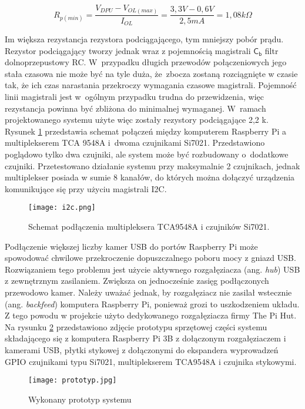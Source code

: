 \documentclass[a4paper,11pt,twoside]{article}
\begin{document}
\begin{equation} \label{pullup}
R_{p(min)} = \frac{V_{DPU} - V_{OL(max)}}{I_{OL}} = \frac{3,3 V - 0,6 V}{2,5 mA} = 1,08 k\Omega  
\end{equation} 

Im większa rezystancja rezystora podciągającego, tym mniejszy pobór prądu. Rezystor podciągający tworzy jednak wraz z pojemnością magistrali $\mathsf{C_{b}}$ filtr dolnoprzepustowy RC. W~przypadku długich przewodów połączeniowych jego stała czasowa nie może być na tyle duża, że~zbocza zostaną rozciągnięte w czasie tak, że ich czas narastania przekroczy wymagania czasowe magistrali. Pojemność linii magistrali jest w~ogólnym przypadku trudna do przewidzenia, więc rezystancja powinna być zbliżona do minimalnej wymaganej. W~ramach projektowanego systemu użyte więc zostały rezystory podciągające 2,2 k\textOmega. Rysunek \ref{fig: i2c_schemat} przedstawia schemat połączeń między komputerem Raspberry Pi a multiplekserem TCA 9548A i~dwoma czujnikami Si7021. Przedstawiono poglądowo tylko dwa czujniki, ale system może być rozbudowany o~dodatkowe czujniki. Przetestowano działanie systemu przy maksymalnie 2 czujnikach, jednak multiplekser posiada w sumie 8 kanałów, do których można dołączyć urządzenia komunikujące się przy użyciu magistrali I2C.

\begin{figure}[h]
\texttt{[image: i2c.png]}
\caption{Schemat podłączenia multipleksera TCA9548A i czujników Si7021.}
\label{fig: i2c_schemat}
\end{figure}

Podłączenie większej liczby kamer USB do portów Raspberry Pi może spowodować chwilowe przekroczenie dopuszczalnego poboru mocy z gniazd USB. Rozwiązaniem tego problemu jest użycie aktywnego rozgałęziacza (ang. \textit{hub}) USB z zewnętrznym zasilaniem. Zwiększa on jednocześnie zasięg podłączonych przewodowo kamer. Należy uważać jednak, by rozgałęziacz nie zasilał wstecznie (ang. \textit{backfeed}) komputera Raspberry Pi, ponieważ grozi to uszkodzeniem układu. Z tego powodu w projekcie użyto dedykowanego rozgałęziacza firmy The Pi Hut. Na rysunku \ref{fig: prototyp} przedstawiono zdjęcie prototypu sprzętowej części systemu składającego się z komputera Raspberry Pi 3B z dołączonym rozgałęziaczem i kamerami USB, płytki stykowej z dołączonymi do ekspandera wyprowadzeń GPIO czujnikami typu Si7021, multiplekserem TCA9548A i czujnika stykowymi.
\begin{figure}[h]
\begin{center}
\texttt{[image: prototyp.jpg]}
\caption{Wykonany prototyp systemu}
\label{fig: prototyp}
\end{center}
\end{figure}
\end{document}
